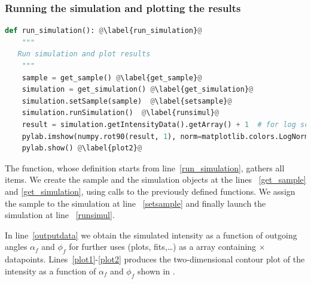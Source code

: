 

\subsubsection{Running the simulation and plotting the results}

\begin{lstlisting}[language=python, style=eclipseboxed,name=ex1,nolol]
def run_simulation(): @\label{run_simulation}@
    """
   Run simulation and plot results
    """
    sample = get_sample() @\label{get_sample}@
    simulation = get_simulation() @\label{get_simulation}@
    simulation.setSample(sample)  @\label{setsample}@
    simulation.runSimulation()  @\label{runsimul}@
    result = simulation.getIntensityData().getArray() + 1  # for log scale  @\label{outputdata}@
    pylab.imshow(numpy.rot90(result, 1), norm=matplotlib.colors.LogNorm(), extent=[-1.0, 1.0, 0, 2.0]) @\label{plot1}@
    pylab.show() @\label{plot2}@
\end{lstlisting}
The function, whose definition starts from line~\ref{run_simulation}, gathers all
items. We create the sample and the simulation objects at the lines 
~\ref{get_sample} and \ref{get_simulation}, using calls to the previously defined functions. We assign the sample to the simulation at line ~\ref{setsample} and
finally launch the simulation at line ~\ref{runsimul}.

In line~\ref{outputdata} we obtain the simulated intensity
as a function of outgoing angles $\alpha_f$ and $\phi_f$ for further
uses (plots, fits,\ldots) as a  array containing
$\times$
datapoints. Lines~\ref{plot1}-\ref{plot2} produces the two-dimensional
contour plot of the intensity as a function of $\alpha_f$ and
$\phi_f$ shown in . 

